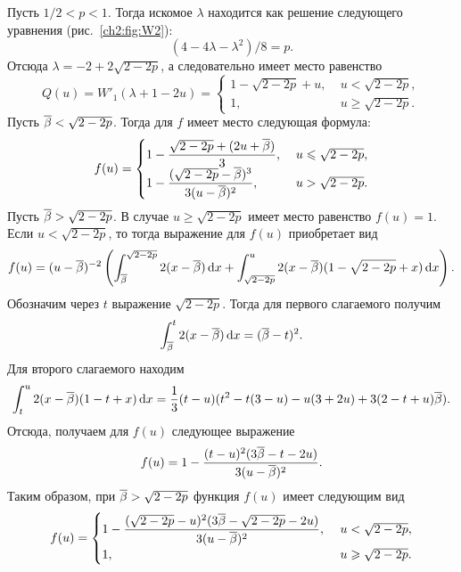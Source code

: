 {\begin{example}
  Пусть $1/2 < p < 1$.
  Тогда искомое $\lambda$ находится как решение следующего уравнения (\seename рис.~\ref{ch2:fig:W2}):
  \[
  (4 - 4\lambda - \lambda^2)/8 = p.
  \]
  Отсюда $\lambda = -2 + 2\sqrt{2 - 2p}$, а следовательно имеет место равенство
  \begin{equation*}
    Q(u) =
    W'_1(\lambda + 1 - 2u) =
    \begin{cases}
      1 - \sqrt{2 - 2p} + u, &\; u < \sqrt{2 - 2p},\\
      1, &\; u \geqslant \sqrt{2 - 2p}.
    \end{cases}
  \end{equation*}
  Пусть ${\overline{\beta}} < \sqrt{2 - 2p}$. Тогда для $f$ имеет место следующая формула:
  \begin{equation*}
    f(u) = \begin{cases}
      {\displaystyle 1 - \frac{\sqrt{2 - 2p} + (2u + \ensuremath{{\overline{\beta}}})}{3}}, &\; u \leqslant \sqrt{2 - 2p},\\
      {\displaystyle 1 - \frac{(\sqrt{2 - 2p} - {\overline{\beta}})^3}{3(u - {\overline{\beta}})^2}}, &\; u > \sqrt{2 - 2p}.
    \end{cases}
  \end{equation*}
  Пусть ${\overline{\beta}} > \sqrt{2-2p}$.
  В случае $u \geq \sqrt{2 - 2p}$ имеет место равенство $f(u) = 1$.
  Если $u < \sqrt{2 - 2p}$, то тогда выражение для $f(u)$ приобретает вид
  \begin{equation*}
    f(u) = (u-{\overline{\beta}})^{-2} \left( 
      \int_{{\overline{\beta}}}^{\sqrt{2-2p}} 2(x-{\overline{\beta}}) \mathop{}\!\mathrm{d} x +
      \int_{\sqrt{2-2p}}^u 2(x-{\overline{\beta}}) (1-\sqrt{2 - 2p} + x) \mathop{}\!\mathrm{d} x
    \right).
  \end{equation*}
  Обозначим через $t$ выражение $\sqrt{2-2p}$.
  Тогда для первого слагаемого получим
  \begin{equation*}
      \int_{{\overline{\beta}}}^t 2(x-{\overline{\beta}}) \mathop{}\!\mathrm{d} x = ({\overline{\beta}} - t)^2.
  \end{equation*}
  Для второго слагаемого находим
  \begin{equation*}
    \int_t^u 2(x - {\overline{\beta}}) (1 - t + x) \mathop{}\!\mathrm{d} x = \frac{1}{3} (t - u)(t^2 - t(3-u) - u(3 + 2u) + 3(2-t+u){\overline{\beta}}).
  \end{equation*}
  Отсюда, получаем для $f(u)$ следующее выражение
  \begin{equation*}
    f(u) = 1 - \frac{(t-u)^2(3{\overline{\beta}} - t - 2u)}{3(u-{\overline{\beta}})^2}.
  \end{equation*}
  Таким образом, при ${\overline{\beta}} > \sqrt{2-2p}$ функция $f(u)$ имеет следующим вид
  \begin{equation*}
    f(u) = \begin{cases}
      {\displaystyle 1 - \frac{(\sqrt{2-2p}-u)^2(3\ensuremath{{\overline{\beta}}}- \sqrt{2-2p} - 2u)}{3(u-\ensuremath{{\overline{\beta}}})^2}},\ & u < \sqrt{2-2p}, \\
      1,\ & u \geqslant \sqrt{2-2p}.
    \end{cases}
  \end{equation*}
  

\end{example}}
